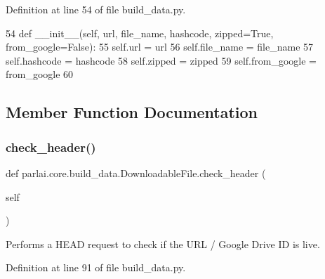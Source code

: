 Definition at line 54 of file build\+\_\+data.\+py.


\begin{DoxyCode}
54     \textcolor{keyword}{def }\_\_init\_\_(self, url, file\_name, hashcode, zipped=True, from\_google=False):
55         self.url = url
56         self.file\_name = file\_name
57         self.hashcode = hashcode
58         self.zipped = zipped
59         self.from\_google = from\_google
60 
\end{DoxyCode}


\subsection{Member Function Documentation}
\mbox{\label{classparlai_1_1core_1_1build__data_1_1DownloadableFile_ad08cadfb6f34f251368bf16fab6e557d}} 
\subsubsection{\texorpdfstring{check\+\_\+header()}{check\_header()}}
{\footnotesize\ttfamily def parlai.\+core.\+build\+\_\+data.\+Downloadable\+File.\+check\+\_\+header (\begin{DoxyParamCaption}\item[{}]{self }\end{DoxyParamCaption})}

\begin{DoxyVerb}Performs a HEAD request to check if the URL / Google Drive ID is live.
\end{DoxyVerb}
 

Definition at line 91 of file build\+\_\+data.\+py.


